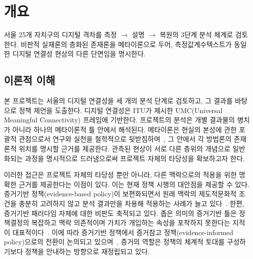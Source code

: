 \section{개요}
\label{sec:overview}


\begin{quoteblock}
서울 25개 자치구의 디지털 격차를 측정 $\rightarrow$ 설명 $\rightarrow$ 복원의 3단계 분석 체계로 검토한다. 비판적 실재론의 층화된 존재론을 메타이론으로 두어, 측정값\textperiodcentered{}계수\textperiodcentered{}텍스트가 동일한 디지털 연결성 현상의 다른 단면임을 명시한다.
\end{quoteblock}


\subsection{이론적 이해}
\label{subsec:1-1}

본 프로젝트는 서울의 디지털 연결성을 세 개의 분석 단계로 검토하고, 그 결과를 바탕으로 정책 제언을 도출한다. 디지털 연결성은 ITU가 제시한 UMC(Universal Meaningful Connectivity) 프레임에 기반한다. 프로젝트의 분석은 개별 결과물의 병치가 아니라 하나의 메타이론적 틀 안에서 해석된다. 메타이론은 현실의 본성에 관한 포괄적 관점으로서 연구와 실천을 철학적으로 뒷받침하며~\citep{AllanaClark2018}, 그 안에서 각 방법론의 존재론적 위치를 명시할 근거를 제공한다. 관측된 현상이 서로 다른 층위의 개념으로 일반화되는 과정을 명시적으로 드러냄으로써 프로젝트 자체의 타당성을 확보하고자 한다.

이러한 접근은 프로젝트 자체의 타당성 뿐만 아니라, 다른 맥락으로의 적용을 위한 명확한 근거를 제공한다는 이점이 있다. 이는 현재 정책 시행의 대안점을 제공할 수 있다. 증거기반 정책(evidence-based policy)이 보편화되면서 원래 맥락의 제도적\textperiodcentered{}문화적 조건을 충분히 고려하지 않고 분석 결과만을 차용해 적용하는 사례가 늘고 있다~\citep{DolowitzMarsh2000}. 한편, 증거기반 패러다임 자체에 대한 비판도 축적되고 있다. 좁은 의미의 증거기반 틀은 정책결정의 복잡하고 맥락 의존적이며 가치가 개입하는 속성을 포착하지 못한다는 지적이 대표적이다~\citep{GreenhalghRussell2009}. 이에 따라 증거기반 정책에서 증거참고 정책(evidence-informed policy)으로의 전환이 논의되고 있으며~\citep{Head2010}, 증거의 역할은 정책의 체계적 토대를 구성하기보다 정책을 안내하는 방향으로 재정립되고 있다.

